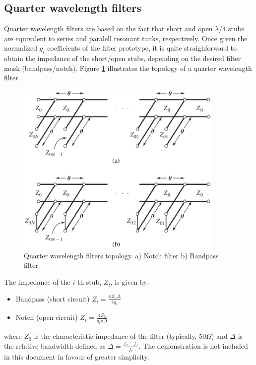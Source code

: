 \subsection{Quarter wavelength filters}

Quarter wavelength filters are based on the fact that short and open $\lambda/4$ stubs are equivalent to series and paralell resonant tanks, respectively. Once given the normalized $g_i$ coefficients of the filter prototype, it is quite straighforward to obtain the impedance of the short/open stubs, depending on the desired filter mask (bandpass/notch). Figure \ref{eq:QWfilter} illustrates the topology of a quarter wavelength filter.\\

\begin{figure}[h!]
\centering
\includegraphics[width=100mm]{QuarterWavelengthFilter}
\caption{Quarter wavelength filters topology. a) Notch filter b) Bandpass filter \cite{Pozar}}
\label{eq:QWfilter}
\end{figure}

\noindent The impedance of the $i$-th stub, $Z_i$, is given by:

\begin{itemize}
\item{Bandpass (short circuit)} $Z_i = \frac{\pi Z_0 \Delta}{4g_i}$
\item{Notch (open circuit)} $Z_i = \frac{4 Z_0 }{g_i\pi \Delta}$
\end{itemize}

\noindent where $Z_0$ is the characteristic impedance of the filter (typically, 50$\Omega$) and $\Delta$ is the relative bandwidth defined as $\Delta = \frac{f_2 - f_1}{f_c}$. The demonstration \cite{Pozar} is not included in this document in favour of greater simplicity.

